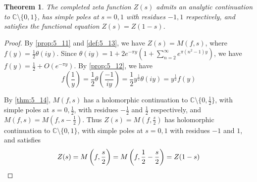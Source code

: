 \documentclass[11pt]{article}
\theoremstyle{definition}
\theoremstyle{plain}
\newtheorem{theorem}[definition]{Theorem}
\theoremstyle{remark}
\newcommand{\CC}{\mathbb{C}}
\begin{document}
\begin{theorem}\label{thm:5_15}
    The completed zeta function $Z(s)$ admits an analytic continuation to $\CC \setminus \{0, 1\}$, has simple poles at $s=0,1$ with residues $-1,1$ respectively, and satisfies the functional equation $Z(s) = Z(1-s)$.
\end{theorem}
\begin{proof}
    By \autoref{prop:5_11} and \autoref{def:5_13}, we have $Z(s) = M(f,s)$, where $f(y) = \frac{1}{2} \theta(iy)$. Since $\theta(i y) = 1 + 2e^{-\pi y} (1 + \sum_{n=2}^\infty e^{\pi (n^2-1) y})$, we have $f(y) = \frac{1}{2} + O(e^{-\pi y})$. By \autoref{prop:5_12}, we have
    \begin{equation*}
        f\left(\frac{1}{y}\right) = \frac{1}{2} \theta\left(\frac{-1}{iy}\right) = \frac{1}{2} y^{\frac{1}{2}} \theta(iy) = y^{\frac{1}{2}} f(y)
    \end{equation*}

    By \autoref{thm:5_14}, $M(f,s)$ has a holomorphic continuation to $\CC \setminus \{0, \frac{1}{2}\}$, with simple poles at $s = 0, \frac{1}{2}$, with residues $-\frac{1}{2}$ and $\frac{1}{2}$ respectively, and $M(f, s) = M(f, s - \frac{1}{2})$. Thus $Z(s) = M(f, \frac{s}{2})$ has holomorphic continuation to $\CC \setminus \{0,1\}$, with simple poles at $s=0,1$ with residues $-1$ and $1$, and satisfies
    \begin{equation*}
        Z(s) = M\left(f, \frac{s}{2}\right) = M\left(f, \frac{1}{2} - \frac{s}{2}\right) = Z(1-s) \qedhere
    \end{equation*}
\end{proof}
\end{document}
